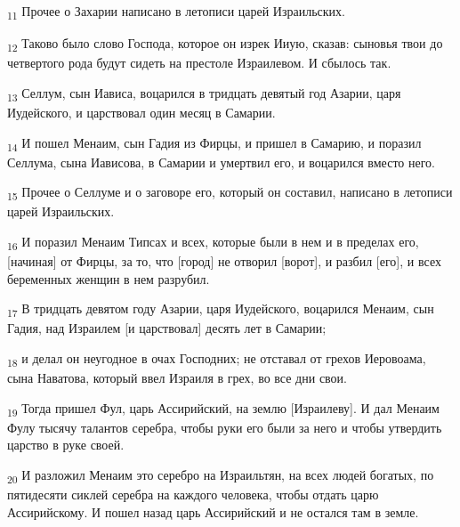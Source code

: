 \begin{tcolorbox}
\textsubscript{11} Прочее о Захарии написано в летописи царей Израильских.
\end{tcolorbox}
\begin{tcolorbox}
\textsubscript{12} Таково было слово Господа, которое он изрек Ииую, сказав: сыновья твои до четвертого рода будут сидеть на престоле Израилевом. И сбылось так.
\end{tcolorbox}
\begin{tcolorbox}
\textsubscript{13} Селлум, сын Иависа, воцарился в тридцать девятый год Азарии, царя Иудейского, и царствовал один месяц в Самарии.
\end{tcolorbox}
\begin{tcolorbox}
\textsubscript{14} И пошел Менаим, сын Гадия из Фирцы, и пришел в Самарию, и поразил Селлума, сына Иависова, в Самарии и умертвил его, и воцарился вместо него.
\end{tcolorbox}
\begin{tcolorbox}
\textsubscript{15} Прочее о Селлуме и о заговоре его, который он составил, написано в летописи царей Израильских.
\end{tcolorbox}
\begin{tcolorbox}
\textsubscript{16} И поразил Менаим Типсах и всех, которые были в нем и в пределах его, [начиная] от Фирцы, за то, что [город] не отворил [ворот], и разбил [его], и всех беременных женщин в нем разрубил.
\end{tcolorbox}
\begin{tcolorbox}
\textsubscript{17} В тридцать девятом году Азарии, царя Иудейского, воцарился Менаим, сын Гадия, над Израилем [и царствовал] десять лет в Самарии;
\end{tcolorbox}
\begin{tcolorbox}
\textsubscript{18} и делал он неугодное в очах Господних; не отставал от грехов Иеровоама, сына Наватова, который ввел Израиля в грех, во все дни свои.
\end{tcolorbox}
\begin{tcolorbox}
\textsubscript{19} Тогда пришел Фул, царь Ассирийский, на землю [Израилеву]. И дал Менаим Фулу тысячу талантов серебра, чтобы руки его были за него и чтобы утвердить царство в руке своей.
\end{tcolorbox}
\begin{tcolorbox}
\textsubscript{20} И разложил Менаим это серебро на Израильтян, на всех людей богатых, по пятидесяти сиклей серебра на каждого человека, чтобы отдать царю Ассирийскому. И пошел назад царь Ассирийский и не остался там в земле.
\end{tcolorbox}
